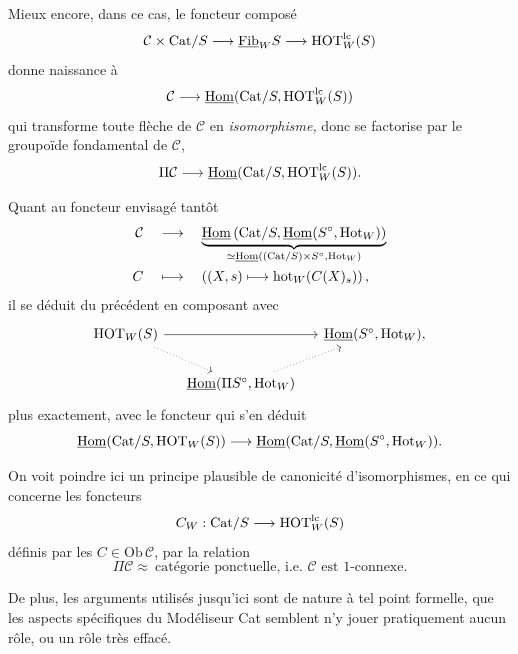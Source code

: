 Mieux encore, dans ce cas, le foncteur composé
\[
\mathcal{C} \times \mathrm{Cat}/S \longrightarrow \underline{\mathrm{Fib}}_W S \longrightarrow \mathrm{HOT}^{\mathrm{lc}}_W(S)
\]
donne naissance à
\[
\mathcal{C} \longrightarrow \underline{\mathrm{Hom}}(\mathrm{Cat}/S, \mathrm{HOT}^{\mathrm{lc}}_W(S))
\]
qui transforme toute flèche de $\mathcal{C}$ en \textit{isomorphisme,} donc se factorise par le groupoïde fondamental de $\mathcal{C}$,
\[
\Pi\mathcal{C} \longrightarrow \underline{\mathrm{Hom}}(\mathrm{Cat}/S, \mathrm{HOT}^{\mathrm{lc}}_W(S)).
\]

Quant au foncteur envisagé tantôt
\[
\begin{aligned}
\mathcal{C} &\quad\longrightarrow\quad \underbrace{\underline{\mathrm{Hom}}\,(\mathrm{Cat}/S, \underline{\mathrm{Hom}}(S^\circ, \mathrm{Hot}_W))}_{\simeq\underline{\mathrm{Hom}}((\mathrm{Cat}/S)\times S^\circ, \mathrm{Hot}_W)} \\
C &\quad\longmapsto\quad ((X,s) \longmapsto \mathrm{hot}_W(C(X)_s))\,,
\end{aligned}
\]
il se déduit du précédent en composant avec
\[
\begin{tikzcd}[column sep=small]
\HOT_W(S) \arrow[rr] \arrow[dr, dotted] & & \Hom(S^\circ, \Hot_W), \\
 & \Hom(\Pi S^\circ, \Hot_W) \arrow[ur, dotted] &
\end{tikzcd}
\]
plus exactement, avec le foncteur qui s'en déduit
\[
\underline{\mathrm{Hom}}(\mathrm{Cat}/S, \mathrm{HOT}_W(S)) \longrightarrow \underline{\mathrm{Hom}}(\mathrm{Cat}/S, \underline{\mathrm{Hom}}(S^\circ, \mathrm{Hot}_W)).
\]

On voit poindre ici un principe plausible de canonicité d'isomorphismes, en ce qui concerne les foncteurs
\[
C_W : \mathrm{Cat}/S \longrightarrow \mathrm{HOT}^{\mathrm{lc}}_W(S)
\]
définis par les $C \in \mathrm{Ob}\,\mathcal{C}$, par la relation
\[
\Pi\mathcal{C} \approx \ \text{catégorie ponctuelle, i.e. } \mathcal{C} \text{ est 1-connexe.}
\]

De plus, les arguments utilisés jusqu'ici sont de nature à tel point formelle, que les aspects spécifiques du Modéliseur Cat
semblent n'y jouer pratiquement aucun rôle, ou un rôle très effacé.

